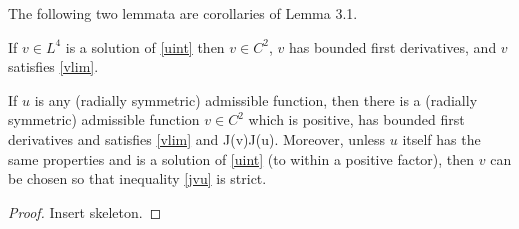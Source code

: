 The following two lemmata are corollaries of Lemma 3.1.
\begin{lemma} 
    If $v\in L^4$ is a solution of \eqref{uint} then $v\in C^2$, $v$ has
    bounded first derivatives, and $v$ satisfies \eqref{vlim}.
\end{lemma}
\begin{lemma}\label{jineqlem}
    If $u$ is any (radially symmetric) admissible function, then there is a
    (radially symmetric) admissible function $v\in C^2$ which is positive, has
    bounded first derivatives and satisfies \eqref{vlim} and 
\be\label{jvu}
J(v)\leq J(u).
\ee
    Moreover, unless $u$ itself has the same properties and is a solution of 
    \eqref{uint} (to within a positive factor), then $v$ can be chosen so that
    inequality \eqref{jvu} is strict.
\end{lemma}
\begin{proof}
{\red Insert skeleton.}
\end{proof}

% 
% 


